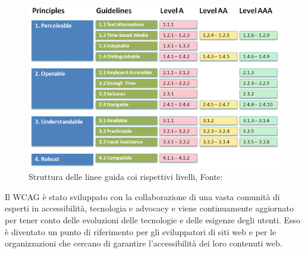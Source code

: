 \documentclass[a4paper,final,12pt]{report}
\begin{document}
\begin{figure}[hbtp]
\centering
\includegraphics[scale=0.38]{img_concettuale/wcag.png}
\caption{Struttura delle linee guida coi rispettivi livelli, Fonte: \cite{antonio}}
\end{figure}

Il WCAG è stato sviluppato con la collaborazione di una vasta comunità di esperti in accessibilità, tecnologia e advocacy e viene continuamente aggiornato per tener conto delle evoluzioni delle tecnologie e delle esigenze degli utenti. Esso è diventato un punto di riferimento per gli sviluppatori di siti web e per le organizzazioni che cercano di garantire l'accessibilità dei loro contenuti web.
\end{document}
